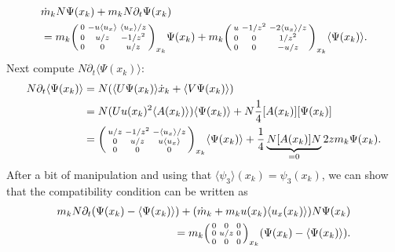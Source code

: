 \documentclass[english,master]{liumaiex}
\theoremstyle{thesisplain}
\theoremstyle{thesisdefinition}
\numberwithin{equation}{section}
\begin{document}
\begin{equation}
\begin{aligned}
	&\dot{m}_k N \Psi(x_k) + m_k N \partial_t \Psi(x_k) \\
	&= m_k
	\begin{psmallmatrix}
		0 & -u\langle u_x \rangle & \langle u_x \rangle/z \\
		0 & u/z & -1/z^2 \\
		0 & 0 & u/z \\
	\end{psmallmatrix}_{x_k} \Psi(x_k)
	+m_k
	\begin{psmallmatrix}
		u & -1/z^2 & -2\langle u_x \rangle/z \\
		0 & 0 & 1/z^2 \\
		0 & 0 & -u/z \\
	\end{psmallmatrix}_{x_k} \langle \Psi(x_k) \rangle.
\end{aligned}
\end{equation}
%
Next compute $N \partial_t \langle \Psi(x_k) \rangle$:
\begin{equation}
\begin{aligned}
	N \partial_t \langle \Psi(x_k) \rangle 
	&= N (\langle U \Psi(x_k) \rangle \dot{x}_k + \langle V \Psi(x_k) \rangle)\\
	&= N (U u(x_k)^2 \langle A(x_k) \rangle) \langle \Psi(x_k) \rangle + N\frac{1}{4}[A(x_k)][\Psi(x_k)] \\
	&= 
	\begin{psmallmatrix}
		u/z & -1/z^2 & -\langle u_x \rangle/z \\
		0 & u/z & u \langle u_x \rangle \\
		0 & 0 & 0 \\
	\end{psmallmatrix}_{x_k} \langle \Psi(x_k) \rangle
	+\frac{1}{4} \underbrace{N [A(x_k)] N}_{=0} 2z m_k \Psi(x_k).
\end{aligned}
\end{equation}
After a bit of manipulation and using that $\langle \psi_3 \rangle (x_k) = \psi_3(x_k)$, we can show that the compatibility condition can be written as
\begin{equation}
\begin{aligned}
	m_k N \partial_t (\Psi(x_k) - \langle \Psi(x_k) \rangle) + (\dot{m}_k + m_k u(x_k) \langle u_x(x_k) \rangle) N \Psi(x_k) \\
	= m_k \begin{psmallmatrix}
		0 & 0 & 0 \\
		0 & u/z & 0 \\
		0 & 0 & 0
	\end{psmallmatrix}_{x_k} (\Psi(x_k) - \langle \Psi(x_k) \rangle).
\end{aligned}
\end{equation}
\end{document}
